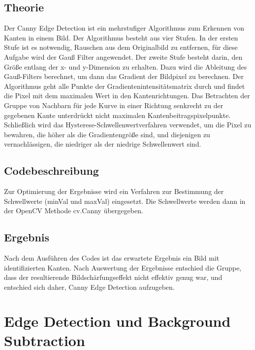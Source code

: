 \documentclass[12pt]{scrartcl}
\begin{document}
\subsection{Theorie}
Der Canny Edge Detection ist ein mehrstufiger Algorithmus zum Erkennen von Kanten in einem Bild. Der Algorithmus besteht aus vier Stufen. In der ersten Stufe ist es notwendig, Rauschen aus dem Originalbild zu entfernen, f\"ur diese Aufgabe wird der Gau{\ss} Filter angewendet. Der zweite Stufe besteht darin, den Gr\"o{\ss}e entlang der x- und y-Dimension zu erhalten. Dazu wird die Ableitung des Gau{\ss}-Filters berechnet, um dann das Gradient der Bildpixel zu berechnen.
Der Algorithmus geht alle Punkte der Gradientenintensit\"atsmatrix durch und findet die Pixel mit dem maximalen Wert in den Kantenrichtungen.
Das Betrachten der Gruppe von Nachbarn f\"ur jede Kurve in einer Richtung senkrecht zu der gegebenen Kante unterdr\"uckt nicht maximalen Kantenbeitragspixelpunkte. Schlie{\ss}lich wird das Hysterese-Schwellenwertverfahren verwendet, um die Pixel zu bewahren, die h\"oher als die Gradientengr\"o{\ss}e sind, und diejenigen zu vernachl\"assigen, die niedriger als der niedrige Schwellenwert sind.
\subsection{Codebeschreibung}
Zur Optimierung der Ergebnisse wird ein Verfahren zur Bestimmung der Schwellwerte (minVal und maxVal) eingesetzt. Die Schwellwerte werden dann in der OpenCV Methode cv.Canny \"ubergegeben.\\
\subsection{Ergebnis}
Nach dem Ausf\"uhren des Codes ist das erwartete Ergebnis ein Bild mit identifizierten Kanten. Nach Auswertung der Ergebnisse entschied die Gruppe, dass der resultierende Bildsch\"arfungseffekt nicht effektiv genug war, und entschied sich daher, Canny Edge Detection aufzugeben.\\





\section{Edge Detection und Background Subtraction}
\end{document}

